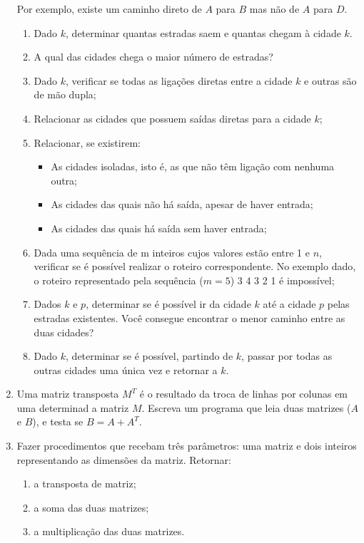 \begin{enumerate}
Por exemplo, existe um caminho direto de $A$ para $B$ mas não de $A$ para $D$.

\begin{enumerate}
\item Dado $k$, determinar quantas estradas saem e quantas chegam à cidade $k$.
\item  A qual das cidades chega o maior número de estradas?
\item Dado $k$, verificar se todas as ligações diretas entre a cidade $k$ e 
   outras são de mão dupla;
\item  Relacionar as cidades que possuem saídas diretas para a cidade $k$;
\item Relacionar, se existirem:
  \begin{itemize}
   \item As cidades isoladas, isto é, as que não têm ligação com nenhuma outra;
   \item As cidades das quais não há saída, apesar de haver entrada;
   \item As cidades das quais há saída sem haver entrada;
  \end{itemize}
\item Dada uma sequência de m inteiros cujos valores estão entre 1 e $n$,
   verificar se é possível realizar o roteiro correspondente. No 
   exemplo dado, o roteiro representado pela sequência ($m=5$) 3 4 3 2 1
   é impossível;
\item Dados $k$ e $p$, determinar se é possível ir da cidade $k$ até a cidade 
   $p$
   pelas estradas existentes. Você consegue encontrar o menor caminho
   entre as duas cidades?
\item Dado $k$, determinar se é possível, partindo de $k$, passar por todas as
   outras cidades uma única vez e retornar a $k$.
\end{enumerate}

\item Uma matriz transposta $M^T$ é o resultado da troca de linhas por colunas em uma determinad
a matriz $M$.
Escreva um programa que leia duas matrizes ($A$ e $B$), e testa se $B = A +
 A^T$.

\item Fazer procedimentos que recebam três parâmetros:  uma matriz e dois
   inteiros representando as dimensões da matriz. Retornar: 
  \begin{enumerate} 
    \item a transposta de matriz; 
    \item a soma das duas matrizes;
    \item a multiplicação das duas matrizes.
  \end{enumerate} 


\end{enumerate}
